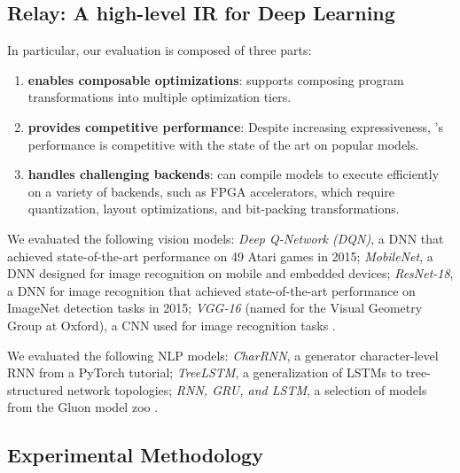 \subsection{Relay: A high-level IR for Deep Learning}
  In particular, our evaluation is composed of three parts:
  \begin{enumerate}
    \item \textbf{\relay enables composable optimizations}: \relay
      supports composing program transformations into multiple optimization tiers.
    \item \textbf{\relay provides competitive performance}: Despite increasing
      expressiveness, \relay's performance is competitive with the
      state of the art on popular models.
    \item \textbf{\relay handles challenging backends}: \relay can compile
      models to execute efficiently on a variety of
      backends, such as FPGA accelerators, which require quantization, layout
      optimizations, and bit-packing transformations.
  \end{enumerate}

  We evaluated the following vision models:
    \textit{Deep Q-Network (DQN)}, a DNN that achieved state-of-the-art performance
    on 49 Atari games in 2015;
    \textit{MobileNet}, a DNN designed for image recognition on mobile and
    embedded devices;
    \textit{ResNet-18}, a DNN for image recognition that achieved state-of-the-art
    performance on ImageNet detection tasks in 2015;
    \textit{VGG-16} (named for the Visual Geometry Group
    at Oxford), a CNN used for image recognition tasks
    \cite{dqn, mobilenet, resnet, vgg}.

  We evaluated the following NLP models:
    \textit{CharRNN}, a generator character-level
    RNN from a PyTorch tutorial;
    \textit{TreeLSTM}, a generalization of LSTMs to
    tree-structured network topologies;
    \textit{RNN, GRU, and LSTM}, a selection of models from the Gluon
    model zoo
    \cite{pytorch_rnn_tut, tree_lstm, gluon_model_zoo}.

  \subsection{Experimental Methodology}

